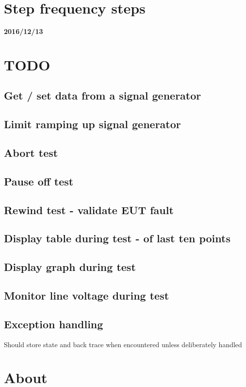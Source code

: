 \section{Step frequency steps}\textbf{2016/12/13}\\


\section{TODO}
\subsection{Get / set data from a signal generator}
\subsection{Limit ramping up signal generator}
\subsection{Abort test}
\subsection{Pause off test}
\subsection{Rewind test - validate EUT fault}
\subsection{Display table during test - of last ten points}
\subsection{Display graph during test}
\subsection{Monitor line voltage during test}
\subsection{Exception handling}
Should store state and back trace when encountered unless deliberately handled\\

\newpage\section{About}
